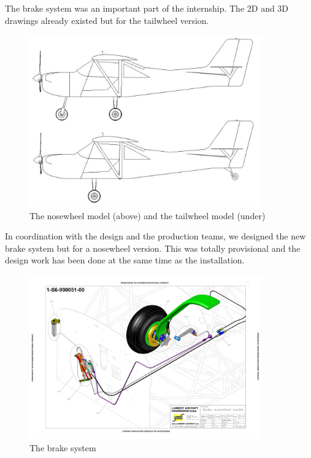 \documentclass[11pt,a4paper]{article}
\begin{document}
The brake system was an important part of the internship. The 2D and 3D drawings already existed but for the tailwheel version.


\begin{figure}[ht!]
	\begin{center}
		\includegraphics[width=10cm]{pics/PIC018.jpg}
		\caption{The nosewheel model (above) and the tailwheel model (under)}
		\label{fig:PIC018}
	\end{center}
\end{figure}


In coordination with the design and the production teams, we designed the new brake system but for a nosewheel version. This was totally provisional and the design work has been done at the same time as the installation.

\begin{figure}[ht!]
	\begin{center}
		\includegraphics[width=10cm,trim = 1.5cm 2.5cm 1.5cm 2.5cm, clip]{pics/PIC019.pdf}
		\caption{The brake system}
		\label{fig:PIC019}
	\end{center}
\end{figure}
\end{document}
